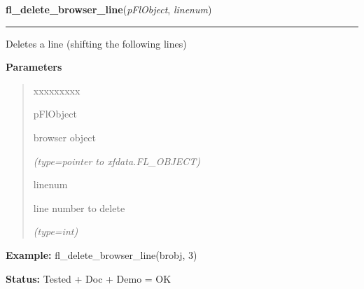     \label{xformslib:flbrowser:fl_delete_browser_line}

    \vspace{0.5ex}

\hspace{.8\funcindent}\begin{boxedminipage}{\funcwidth}

    \raggedright \textbf{fl\_delete\_browser\_line}(\textit{pFlObject}, \textit{linenum})

    \vspace{-1.5ex}

    \rule{\textwidth}{0.5\fboxrule}
\setlength{\parskip}{2ex}
    Deletes a line (shifting the following lines)

\setlength{\parskip}{1ex}
      \textbf{Parameters}
      \vspace{-1ex}

      \begin{quote}
        \begin{Ventry}{xxxxxxxxx}

          \item[pFlObject]

          browser object

            {\it (type=pointer to xfdata.FL\_OBJECT)}

          \item[linenum]

          line number to delete

            {\it (type=int)}

        \end{Ventry}

      \end{quote}

\textbf{Example:} fl\_delete\_browser\_line(brobj, 3)



\textbf{Status:} Tested + Doc + Demo = OK



    \end{boxedminipage}

    \label{xformslib:flbrowser:fl_replace_browser_line}

    \vspace{0.5ex}

